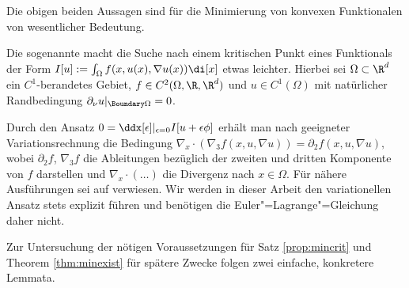 \documentclass{mythesis}
\begin{document}
Die obigen beiden Aussagen sind für die Minimierung von konvexen Funktionalen von wesentlicher Bedeutung.

Die sogenannte  macht die Suche nach einem kritischen Punkt eines Funktionals der Form
\begin{math}
    I[u] := \int_\Omega f(x,u(x),\nabla u(x)) \di[x]
\end{math}
etwas leichter.
Hierbei sei $\Omega \subset \R^d$ ein $C^1$-berandetes Gebiet, $f \in C^2(\Omega, \R, \R^d)$ und $u \in C^1(\Omega)$ mit natürlicher Randbedingung $\partial_\nu u|_{\Boundary \Omega} = 0$.

Durch den Ansatz $0 = \ddx[\epsilon]|_{\epsilon=0} I[u + \epsilon\phi]$ erhält man nach geeigneter Variationsrechnung die Bedingung
\begin{math}
    \nabla_x \cdot (\nabla_3 f(x, u, \nabla u)) = \partial_2 f(x,u,\nabla u),
\end{math}
wobei $\partial_2 f$, $\nabla_3 f$ die Ableitungen bezüglich der zweiten und dritten Komponente von $f$ darstellen und $\nabla_x \cdot (\dotsc)$ die Divergenz nach $x \in \Omega$.
Für nähere Ausführungen sei auf \cite[§8.1]{evans2010partial} verwiesen.
Wir werden in dieser Arbeit den variationellen Ansatz stets explizit führen und benötigen die Euler"=Lagrange"=Gleichung daher nicht.

Zur Untersuchung der nötigen Voraussetzungen für Satz \ref{prop:mincrit} und Theorem \ref{thm:minexist} für spätere Zwecke folgen zwei einfache, konkretere Lemmata.
\end{document}
